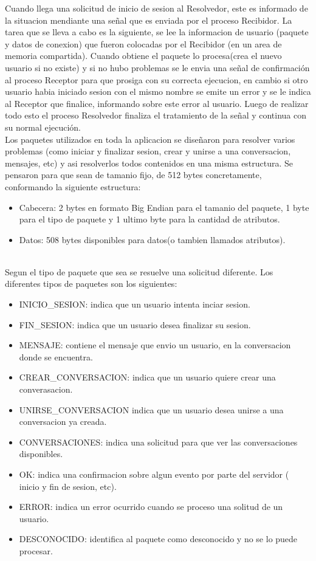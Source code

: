 \documentclass[a4paper,12pt,titlepage]{article}
\begin{document}
Cuando llega una solicitud de inicio de sesion al Resolvedor, este es informado de la situacion mendiante una señal que es enviada por el proceso Recibidor. La tarea que se lleva a cabo es la siguiente, se lee la informacion de usuario (paquete y datos de conexion) que fueron colocadas por el Recibidor (en un area de memoria compartida). Cuando obtiene el paquete lo procesa(crea el nuevo usuario si no existe) y si no hubo problemas se le envia una señal de confirmación al proceso Receptor para que prosiga con su correcta ejecucion, en cambio si otro usuario habia iniciado sesion con el mismo nombre se emite un error y se le indica al Receptor que finalice, informando sobre este error al usuario. Luego de realizar todo esto el proceso Resolvedor finaliza el tratamiento de la señal y continua con su normal ejecución.\\


Los paquetes utilizados en toda la aplicacion se diseñaron para resolver varios problemas (como iniciar y finalizar sesion, crear y unirse a una conversacion, mensajes, etc) y asi resolverlos todos contenidos en una misma estructura.
Se pensaron para que sean de tamanio fijo, de 512 bytes concretamente, conformando la siguiente estructura:

\begin{itemize}
\item Cabecera: 2 bytes en formato Big Endian para el tamanio del paquete, 1 byte para el tipo de paquete y 1 ultimo byte para la cantidad de atributos.
\item Datos: 508 bytes disponibles para datos(o tambien llamados atributos).
\end{itemize}\\

Segun el tipo de paquete que sea se resuelve una solicitud diferente. Los diferentes tipos de paquetes son los siguientes:
\begin{itemize}
\item INICIO\_SESION: indica que un usuario intenta inciar sesion.
\item FIN\_SESION: indica que un usuario desea finalizar su sesion.
\item MENSAJE: contiene el mensaje que envio un usuario, en la conversacion donde se encuentra.
\item CREAR\_CONVERSACION: indica que un usuario quiere crear una converasacion.
\item UNIRSE\_CONVERSACION indica que un usuario desea unirse a una conversacion ya creada.
\item CONVERSACIONES: indica una solicitud para que ver las conversaciones disponibles.
\item OK: indica una confirmacion sobre algun evento por parte del servidor ( inicio y fin de sesion, etc).
\item ERROR: indica un error ocurrido cuando se proceso una solitud de un usuario.
\item DESCONOCIDO: identifica al paquete como desconocido y no se lo puede procesar.

\end{itemize}\\
\end{document}

